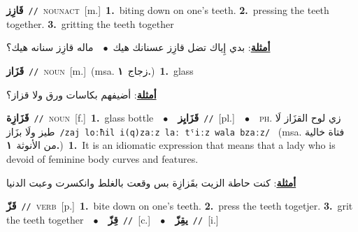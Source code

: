 \documentclass[10pt,a4paper,twoside]{article} %
\begin{document}
\begin{multicols}{2}
{\setlength\topsep{0pt}\textbf{\foreignlanguage{arabic}{قَازِز}}\ {\color{gray}\texttt{//}\color{black}}\ \textsc{noun\textunderscore act}\ [m.]\ \textbf{1.}~biting down on one's teeth.  \textbf{2.}~pressing the teeth together.  \textbf{3.}~gritting the teeth together\  \begin{flushright}\color{gray}\foreignlanguage{arabic}{\textbf{\underline{\foreignlanguage{arabic}{أمثلة}}}: بدي إِياك تضل قازِز عسنانك هيك\ $\bullet$\ \  ماله قازِز سنانه هيك؟}\end{flushright}\color{black}} \vspace{2mm}

{\setlength\topsep{0pt}\textbf{\foreignlanguage{arabic}{قَزَاز}}\ {\color{gray}\texttt{//}\color{black}}\ \textsc{noun}\ [m.]\ \color{gray}(msa. \foreignlanguage{arabic}{زجاج}~\foreignlanguage{arabic}{\textbf{١.}})\color{black}\ \textbf{1.}~glass\  \begin{flushright}\color{gray}\foreignlanguage{arabic}{\textbf{\underline{\foreignlanguage{arabic}{أمثلة}}}: أضيفهم بكاسات ورق ولا قزاز؟}\end{flushright}\color{black}} \vspace{2mm}

{\setlength\topsep{0pt}\textbf{\foreignlanguage{arabic}{قَزَازِة}}\ {\color{gray}\texttt{//}\color{black}}\ \textsc{noun}\ [f.]\ \textbf{1.}~glass bottle\ \ $\bullet$\ \ \setlength\topsep{0pt}\textbf{\foreignlanguage{arabic}{قَزَايِز}}\ {\color{gray}\texttt{//}\color{black}}\ [pl.]\ \ $\bullet$\ \ \textsc{ph.} \color{gray} \foreignlanguage{arabic}{زي لوح القزَاز لَا طيز ولَا بزَاز}\color{black}\ {\color{gray}\texttt{/{\sffamily zaj loːħil i(q)zaːz laː tˤiːz wala bzaːz}/}\color{black}}\ \color{gray} (msa. \foreignlanguage{arabic}{فتاة خالية من الأنوثة}~\foreignlanguage{arabic}{\textbf{١.}})\color{black}\ \textbf{1.}~It is an idiomatic expression that means that a lady who is devoid of feminine body curves and features.\  \begin{flushright}\color{gray}\foreignlanguage{arabic}{\textbf{\underline{\foreignlanguage{arabic}{أمثلة}}}: كنت حاطة الزيت بقَزازِة بس وقعت بالغلط وانكسرت وعبت الدنيا}\end{flushright}\color{black}} \vspace{2mm}

{\setlength\topsep{0pt}\textbf{\foreignlanguage{arabic}{قَزّ}}\ {\color{gray}\texttt{//}\color{black}}\ \textsc{verb}\ [p.]\ \textbf{1.}~bite down on one's teeth.  \textbf{2.}~press the teeth togetjer.  \textbf{3.}~grit the teeth together\ \ $\bullet$\ \ \setlength\topsep{0pt}\textbf{\foreignlanguage{arabic}{قِزّ}}\ {\color{gray}\texttt{//}\color{black}}\ [c.]\ \ $\bullet$\ \ \setlength\topsep{0pt}\textbf{\foreignlanguage{arabic}{يقِزّ}}\ {\color{gray}\texttt{//}\color{black}}\ [i.]\ } \vspace{2mm}


\end{multicols}
\end{document}
